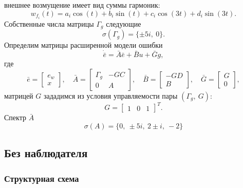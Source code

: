 внешнее возмущение имеет вид суммы гармоник:
\begin{equation*}
    w_{f_i}(t)=a_i\cos(t)+b_i\sin(t) + c_i\cos(3t)+d_i\sin(3t).
\end{equation*}
Собственные числа матрицы $\Gamma_g$ следующие
\begin{equation}
    \label{eq:specGg}
    \sigma(\Gamma_g)=\{\pm5i,\ 0\}.
\end{equation}
Определим матрицы расширенной модели ошибки
\begin{equation}
    \label{eq:errmodel}
    \dot{\bar e}=\bar A\bar e+\bar Bu+\bar Gg,
\end{equation}
где
\begin{equation*}
    \bar e=\begin{bmatrix}
        e_w\\x
    \end{bmatrix},\quad
    \bar A=\begin{bmatrix}
        \Gamma_g&-GC\\0&A
    \end{bmatrix},\quad
    \bar B=\begin{bmatrix}
        -GD\\B
    \end{bmatrix},\quad
    \bar G=\begin{bmatrix}
        G\\0
    \end{bmatrix},
\end{equation*}
матрицей $G$ зададимся из условия управляемости пары $(\Gamma_g,\ G)$:
\begin{equation*}
    G=\begin{bmatrix}
        1&0&1
    \end{bmatrix}^T.
\end{equation*}
Спектр $\bar A$
\begin{equation}
    \label{eq:abarspec}
    \sigma(A)=\{0,\ 
    \pm 5i,\ 
    2 \pm i,\ 
    -2\}
\end{equation}

\subsection{Без наблюдателя}

\subsubsection{Структурная схема}

